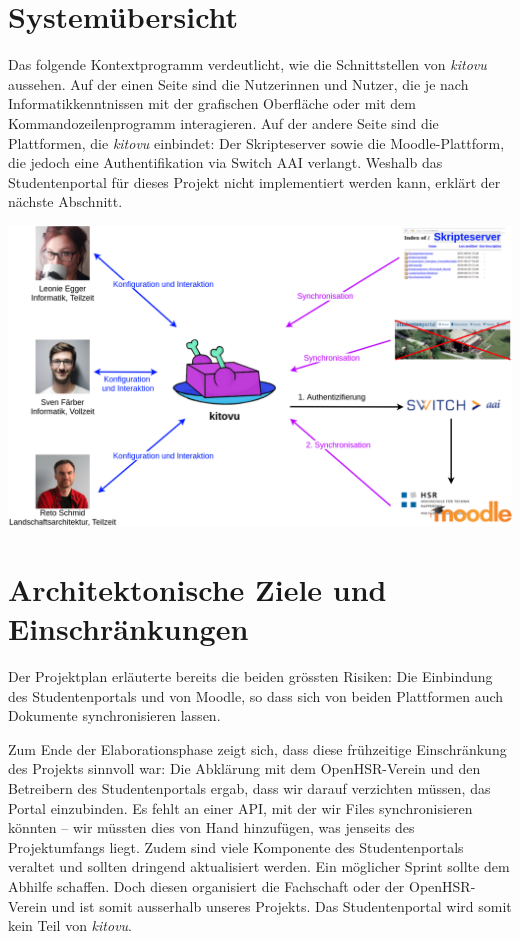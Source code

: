 \documentclass[a4paper]{article}
\let\oldsection\section
\renewcommand\section{\clearpage\oldsection}
\begin{document}
\section{Systemübersicht}

Das folgende Kontextprogramm verdeutlicht, wie die Schnittstellen von \emph{kitovu} aussehen. Auf der einen Seite  sind die Nutzerinnen und Nutzer, die je nach Informatikkenntnissen mit der grafischen Oberfläche oder mit dem Kommandozeilenprogramm interagieren. Auf der andere Seite sind die Plattformen, die \emph{kitovu} einbindet: Der Skripteserver sowie die Moodle-Plattform, die jedoch eine Authentifikation via Switch AAI verlangt. Weshalb das Studentenportal für dieses Projekt nicht implementiert werden kann, erklärt der nächste Abschnitt.

\includegraphics[width=40em]{./img/kontextdiagramm.png}




\section{Architektonische Ziele und Einschränkungen}

Der Projektplan erläuterte bereits die beiden grössten Risiken: Die Einbindung des Studentenportals und von Moodle, so dass sich von beiden Plattformen auch Dokumente synchronisieren lassen.

Zum Ende der Elaborationsphase zeigt sich, dass diese frühzeitige Einschränkung des Projekts sinnvoll war: Die Abklärung mit dem OpenHSR-Verein und den Betreibern des Studentenportals ergab, dass wir darauf verzichten müssen, das Portal einzubinden. Es fehlt an einer API, mit der wir Files synchronisieren könnten -- wir müssten dies von Hand hinzufügen, was jenseits des Projektumfangs liegt. Zudem sind viele Komponente des Studentenportals veraltet und sollten dringend aktualisiert werden. Ein möglicher Sprint sollte dem Abhilfe schaffen. Doch diesen organisiert die Fachschaft oder der OpenHSR-Verein und ist somit ausserhalb unseres Projekts. Das Studentenportal wird somit kein Teil von \emph{kitovu}.
\end{document}
